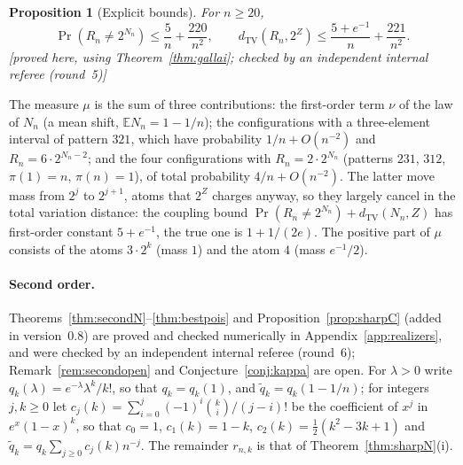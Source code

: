 \documentclass[11pt,a4paper]{article}
\theoremstyle{plain}
\newtheorem{proposition}[theorem]{Proposition}
\theoremstyle{definition}
\theoremstyle{remark}
\newcommand{\status}[1]{\textsf{\small [#1]}}
\begin{document}
\begin{proposition}[Explicit bounds]\label{prop:sharpexplicit}
For $n\ge20$,
\[
\Pr(R_n\ne2^{N_n})\le\frac5n+\frac{220}{n^2},\qquad
d_{\mathrm{TV}}(R_n,2^Z)\le\frac{5+e^{-1}}{n}+\frac{221}{n^2}.
\]
\status{proved here, using Theorem~\ref{thm:gallai}; checked by an independent internal referee (round~5)}
\end{proposition}

\noindent The measure $\mu$ is the sum of three contributions: the first-order term $\nu$ of the law of $N_n$ (a mean shift, $\mathbb E N_n=1-1/n$); the configurations with a three-element interval of pattern $321$, which have probability $1/n+O(n^{-2})$ and $R_n=6\cdot2^{N_n-2}$; and the four configurations with $R_n=2\cdot2^{N_n}$ (patterns $231$, $312$, $\pi(1)=n$, $\pi(n)=1$), of total probability $4/n+O(n^{-2})$. The latter move mass from $2^{j}$ to $2^{j+1}$, atoms that $2^Z$ charges anyway, so they largely cancel in the total variation distance: the coupling bound $\Pr(R_n\ne2^{N_n})+d_{\mathrm{TV}}(N_n,Z)$ has first-order constant $5+e^{-1}$, the true one is $1+1/(2e)$. The positive part of $\mu$ consists of the atoms $3\cdot2^k$ (mass $1$) and the atom $4$ (mass $e^{-1}/2$).

\paragraph{Second order.}
Theorems~\ref{thm:secondN}--\ref{thm:bestpois} and Proposition~\ref{prop:sharpC} (added in version~0.8) are proved and checked numerically in Appendix~\ref{app:realizers}, and were checked by an independent internal referee (round~6); Remark~\ref{rem:secondopen} and Conjecture~\ref{conj:kappa} are open. For $\lambda>0$ write $q_k(\lambda)=e^{-\lambda}\lambda^k/k!$, so that $q_k=q_k(1)$, and $\tilde q_k=q_k(1-1/n)$; for integers $j,k\ge0$ let $c_j(k)=\sum_{i=0}^{j}(-1)^i\binom ki/(j-i)!$ be the coefficient of $x^j$ in $e^x(1-x)^k$, so that $c_0=1$, $c_1(k)=1-k$, $c_2(k)=\tfrac12(k^2-3k+1)$ and $\tilde q_k=q_k\sum_{j\ge0}c_j(k)n^{-j}$. The remainder $r_{n,k}$ is that of Theorem~\ref{thm:sharpN}(i).
\end{document}
